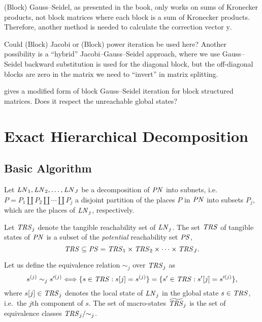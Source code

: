 \documentclass[a4paper,10pt,twoside,openright]{memoir}
\newcommand*{\PN}{\textnormal{\emph{PN}}}
\newcommand*{\LN}{\textnormal{\emph{LN}}}
\renewcommand*{\vec}[1]{\boldsymbol{\mathrm{#1}}}
\newcommand*{\TRS}{\textnormal{\emph{TRS}}}
\newcommand*{\PS}{\textnormal{\emph{PS}}}
\newcommand*{\macroStates}{}\let\macroStates\widetilde
\newcommand*{\macroTRS}{\macroStates{\TRS}}
\begin{document}
(Block) Gauss--Seidel, as presented in the book, only works on sums of
Kronecker products, not block matrices where each block is a sum of
Kronecker products. Therefore, another method is needed to calculate
the correction vector $\vec{y}$.

Could (Block) Jacobi or (Block) power iteration \citep[Section
3.2]{dayar2012analyzing} be used here? Another possibility is a
``hybrid'' Jacobi--Gauss--Seidel approach, where we use Gauss--Seidel
backward substitution is used for the diagonal block, but the
off-diagonal blocks are zero in the matrix we need to ``invert'' in
matrix splitting.

\citet[Equation~(16)]{DBLP:journals/questa/Buchholz94} gives a
modified form of block Gauss--Seidel iteration for block structured
matrices. Does it respect the unreachable global states?

\section{Exact Hierarchical Decomposition}

\subsection{Basic Algorithm}

Let $\LN_1, \LN_2, \ldots, \LN_J$ be a decomposition of $\PN$ into
subnets, i.e.~$P = P_1 \coprod P_2 \coprod \cdots \coprod P_j$ a
disjoint partition of the places $P$ in $\PN$ into subsets $P_j$,
which are the places of $\LN_j$, respectively.

Let $\TRS_j$ denote the tangible reachability set of $\LN_j$. The set
$\TRS$ of tangible states of $\PN$ is a subset of the \emph{potential}
reachability set $\PS$,
\begin{equation}
  \TRS \subseteq \PS = \TRS_1 \times \TRS_2 \times \cdots \times
  \TRS_J\text.
\end{equation}

Let us define the equivalence relation $\sim_j$ over $\TRS_j$ as
\begin{equation}\label{eq:kronecker:state-equivalence}
  s^{(j)} \sim_j s'^{(j)} \Longleftrightarrow \{ s \in \TRS : s[j] =
  s^{(j)} \} = \{ s' \in \TRS : s'[j] = s'^{(j)} \} \text,
\end{equation}
where $s[j] \in \TRS_j$ denotes the local state of $\LN_j$ in the
global state $s \in \TRS$, i.e.~the $j$th component of $s$. The set of
macro-states $\macroTRS_j$ is the set of equivalence classes $\TRS_j /
{\sim_j}$.
\end{document}
